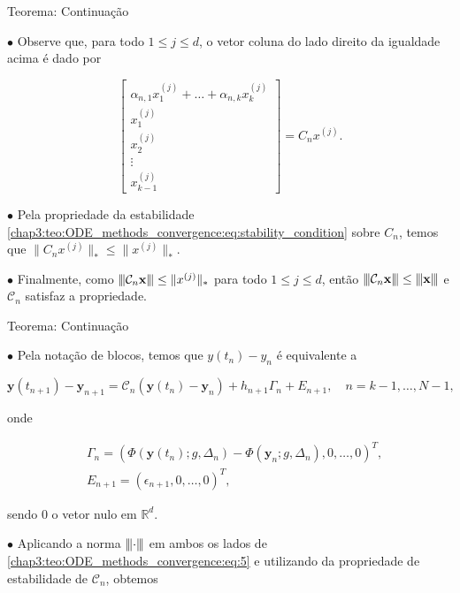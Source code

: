 \documentclass{beamer}
\newcommand{\vertiii}[1]{{\left\vert\kern-0.25ex\left\vert\kern-0.25ex\left\vert #1 
    \right\vert\kern-0.25ex\right\vert\kern-0.25ex\right\vert}}
\theoremstyle{plain}
\theoremstyle{definition}
\begin{document}

\begin{frame}{Teorema: Continuação}
    \small

    \phantom{aa} $\bullet$ Observe que, para todo $1 \leq j \leq d$, o vetor coluna do lado direito da igualdade acima é dado por

    \[
        \begin{bmatrix}
          \alpha_{n,1}x_1 ^{(j)} + \dots + \alpha_{n, k} x_k^{(j)} \\
          x_1^{(j)} \\
          x_2 ^{(j)}\\
          \vdots \\
          x_{k-1}^{(j)}
        \end{bmatrix}
        = 
          C_n x^{(j)}.
    \]

    \phantom{aa} $\bullet$ Pela propriedade da estabilidade \eqref{chap3:teo:ODE_methods_convergence:eq:stability_condition} sobre $C_n$, temos que $\| C_n x^{(j)} \|_* \leq \| x^{(j)} \|_*$. 

    \phantom{aa} $\bullet$ Finalmente, como $\vertiii{ \mathcal{C}_{n} \mathbf{x}} \leq \|x^{(j)}\|_*$ para todo $1 \leq j \leq d$, então $\vertiii{ \mathcal{C}_{n} \mathbf{x}} \leq \vertiii{\mathbf{x}}$ e $\mathcal{C}_n$ satisfaz a propriedade.
\end{frame}


\begin{frame}{Teorema: Continuação}

    \small

    \phantom{aa} $\bullet$ Pela notação de blocos, temos que $y(t_n) - y_n$ é equivalente a 

    \begin{equation}
      \mathbf{y}\left(t_{n+1}\right)-\mathbf{y}_{n+1}=\mathcal{C}_{n}\left(\mathbf{y}\left(t_{n}\right)-\mathbf{y}_{n}\right)+h_{n+1} \Gamma_{n}+E_{n+1}, \quad n=k-1, \ldots, N-1 
      \label{chap3:teo:ODE_methods_convergence:eq:5}, 
    \end{equation}
  
    \noindent
    onde

    \begin{align*}
      &\Gamma_{n}=\left(\Phi\left(\mathbf{y}\left(t_{n}\right) ; g, \Delta_{n}\right)-\Phi\left(\mathbf{y}_{n} ; g, \Delta_{n}\right), 0, \ldots, 0\right)^{T}, \\
      &E_{n+1}=\left(\epsilon_{n+1}, 0, \ldots, 0\right)^{T},
    \end{align*}

    \noindent
    sendo 0 o vetor nulo em \(\mathbb{R}^{d}\). 

    \phantom{aa} $\bullet$ Aplicando a norma $\vertiii{\cdot}$ em ambos os lados de \eqref{chap3:teo:ODE_methods_convergence:eq:5} e utilizando da propriedade de estabilidade de $\mathcal{C}_n$, obtemos

\end{frame}
\end{document}
